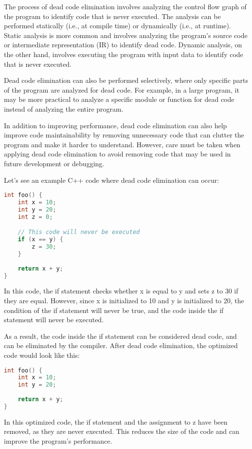 The process of dead code elimination involves analyzing the control flow graph of the program to identify code that is never executed. The analysis can be performed statically (i.e., at compile time) or dynamically (i.e., at runtime). Static analysis is more common and involves analyzing the program's source code or intermediate representation (IR) to identify dead code. Dynamic analysis, on the other hand, involves executing the program with input data to identify code that is never executed.

Dead code elimination can also be performed selectively, where only specific parts of the program are analyzed for dead code. For example, in a large program, it may be more practical to analyze a specific module or function for dead code instead of analyzing the entire program.

In addition to improving performance, dead code elimination can also help improve code maintainability by removing unnecessary code that can clutter the program and make it harder to understand. However, care must be taken when applying dead code elimination to avoid removing code that may be used in future development or debugging.

Let's see an example C++ code where dead code elimination can occur:

\begin{lstlisting}[language=C++]
int foo() {
    int x = 10;
    int y = 20;
    int z = 0;

    // This code will never be executed
    if (x == y) {
        z = 30;
    }
    
    return x + y;
}
\end{lstlisting}

In this code, the if statement checks whether x is equal to y and sets z to 30 if they are equal. However, since x is initialized to 10 and y is initialized to 20, the condition of the if statement will never be true, and the code inside the if statement will never be executed.

As a result, the code inside the if statement can be considered dead code, and can be eliminated by the compiler. After dead code elimination, the optimized code would look like this:

\begin{lstlisting}[language=C++]
int foo() {
    int x = 10;
    int y = 20;
    
    return x + y;
}
\end{lstlisting}

In this optimized code, the if statement and the assignment to z have been removed, as they are never executed. This reduces the size of the code and can improve the program's performance.

